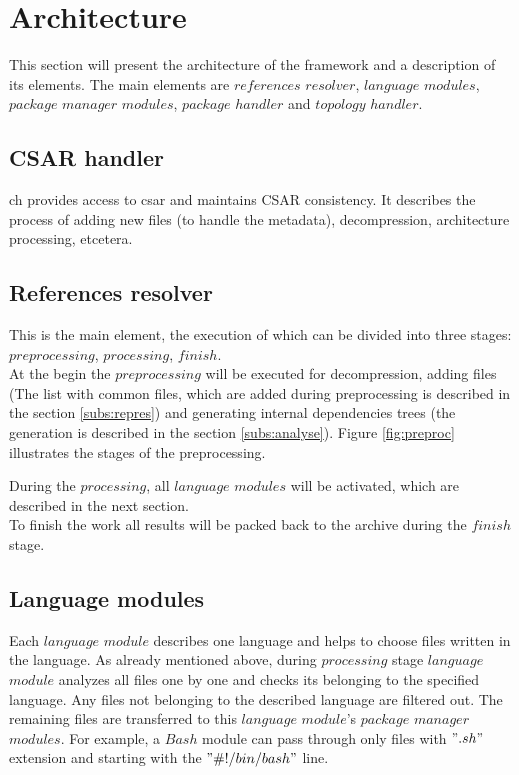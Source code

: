 \section{Architecture}\label{sec:arch}
This section will present the architecture of the framework and a description of its elements.
The main elements are $references$ $resolver$, $language$ $modules$, $package$ $manager$ $modules$, $package$ $handler$ and $topology$ $handler$.

\subsection{CSAR handler} \label{subs:casr_h}
\gls{ch} provides access to \gls{csar} and maintains CSAR consistency. 
It describes the process of adding new files (to handle the metadata), decompression, architecture processing, etcetera.

\subsection{References resolver} \label{subs:RR}
This is the main element, the execution of which can be divided into three stages: $preprocessing$, $processing$, $finish$. \\
At the begin the $preprocessing$ will be executed for decompression, adding files (The list with common files, which are added during preprocessing is described in the section \ref{subs:repres}) and generating internal dependencies trees (the generation is described in the section \ref{subs:analyse}).
Figure \ref{fig:preproc} illustrates the stages of the preprocessing.

During the $processing$, all $language$ $modules$ will be activated, which are described in the next section. \\
To finish the work  all results will be packed back to the archive during the $finish$ stage.
\subsection{Language modules} \label{subs:archlm}
Each $language$ $module$ describes one language and helps to choose files written in the language.
As already mentioned above, during $processing$ stage $language$ $module$ analyzes all files one by one and checks its belonging to the specified language. 
Any files not belonging to the described language are filtered out.
The remaining files are transferred to this $language$ $module$'s $package$ $manager$ $modules$.
For example, a $Bash$ module can pass through only files with $".sh"$ extension and starting with the $"\#!/bin/bash"$ line.
